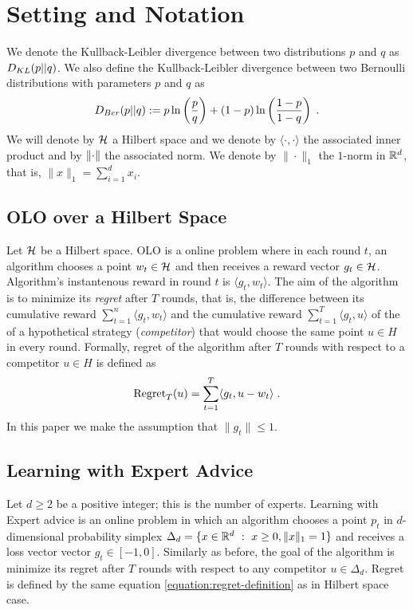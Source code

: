 \section{Setting and Notation}

We denote the Kullback-Leibler divergence between two distributions $p$ and $q$
as $D_{KL}(p||q)$. We also define the Kullback-Leibler divergence between two
Bernoulli distributions with parameters $p$ and $q$ as
$$
D_{Ber}(p||q) := p \ln \left(\frac{p}{q} \right) + (1-p) \ln \left(\frac{1-p}{1-q} \right) \; .
$$
We will denote by $\mathcal{H}$ a Hilbert space and we denote by $\langle \cdot,
\cdot\rangle$  the associated inner product and by $\left\|{\cdot}\right\|$ the associated
norm. We denote by $\|\cdot\|_1$ the $1$-norm in $\mathbb{R}^d$, that is, $\|x\|_1 =
\sum_{i=1}^d x_i$.

\subsection{\ac{OLO} over a Hilbert Space}

Let $\mathcal{H}$ be a Hilbert space. \ac{OLO} is a online problem where in each round
$t$, an algorithm chooses a point $w_t \in \mathcal{H}$ and then receives a reward vector
$g_t \in \mathcal{H}$. Algorithm's instantenous reward in round $t$ is $\langle g_t, w_t
\rangle$. The aim of the algorithm is to minimize its \emph{regret} after $T$
rounds, that is, the difference between its cumulative reward $\sum_{t=1}^n
\langle g_t, w_t \rangle$ and the cumulative reward $\sum_{t=1}^T \langle g_t, u
\rangle$ of the of a hypothetical strategy (\emph{competitor}) that would choose
the same point $u \in H$ in every round. Formally, regret of the algorithm after
$T$ rounds with respect to a competitor $u \in H$ is defined as
\begin{equation}
\label{equation:regret-definition}
\operatorname{Regret}_T(u) = \sum_{t=1}^T \langle g_t , u - w_t \rangle \; .
\end{equation}
In this paper we make the assumption that $\|g_t\| \le 1$.

\subsection{Learning with Expert Advice}

Let $d \ge 2$ be a positive integer; this is the number of experts. Learning
with Expert advice is an online problem in which an algorithm chooses a point
$p_t$ in $d$-dimensional probability simplex $\Delta_d = \{ x \in \mathbb{R}^d ~:~ x \ge
0, \|x\|_1 = 1 \}$ and receives a loss vector vector $g_t \in [-1,0]$. Similarly
as before, the goal of the algorithm is minimize its regret after $T$ rounds
with respect to any competitor $u \in \Delta_d$. Regret is defined by the same
equation \eqref{equation:regret-definition} as in Hilbert space case.


